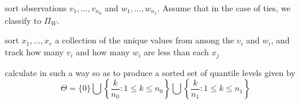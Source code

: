 \begin{algorithm}[p]
  \label{alg:empirically-optimal-classifier}
  \DontPrintSemicolon
  \BlankLine
  
  sort observations $v_1, \dots, v_{n_0}$ and $w_1, \dots, w_{n_1}$.  Assume
  that in the case of ties, we classify to $\Pi_W$. \;
  
  sort $x_1, \dots, x_r$ a collection of the unique values from among the $v_i$
  and $w_i$, and track how many $v_i$ and how many $w_i$ are less than each
  $x_j$ \;
  
  calculate in such a way so as to produce a sorted set of quantile levels given by
  \begin{equation*}
    \Theta = \Big\{ 0 \Big\} \bigcup
    \left\{ \frac{k}{n_0}: 1 \leq k \leq n_0 \right\} \bigcup
    \left\{ \frac{k}{n_1}: 1 \leq k \leq n_1 \right\}
  \end{equation*}

  \ForEach{$i$ in 2 to $|\Theta|$}{
    
    \BlankLine
    
    calculate $\hat{F}_V^{-1}(\theta_i)$ and $\hat{F}_W^{-1}(\theta_i)$, and
    find
    \begin{equation*}
      a = \min \Big\{ \hat{F}_0^{-1}(\theta_i),~ \hat{F}_1^{-1}(\theta_i) \Big\}
      \hspace{5mm} \text{and} \hspace{5mm}
      b = \max \Big\{ \hat{F}_0^{-1}(\theta_i),~ \hat{F}_1^{-1}(\theta_i) \Big\}
    \end{equation*}

    calculate the interval
    \[
      G_i = \Big[
      \theta_i\, a + (1 - \theta_i)\, b,
      \hspace{3mm}
      \theta_{i-1}\, a + (1 - \theta_{i-1})\, b\,
      \Big) = \big[x_{\scriptscriptstyle\text{low}},\,
      x_{\scriptscriptstyle\text{high}}\big)
    \]

    find the smallest $x_i \in [x_{\scriptscriptstyle\text{low}}, \infty)$.  If
    $x_i \geq x_{\scriptscriptstyle\text{high}}$ then calculate the
    classification rate for $G_i$.

}
\end{algorithm}
